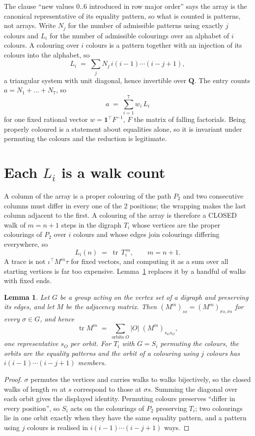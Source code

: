 \documentclass[11pt,a4paper]{article}
\theoremstyle{plain}
\newtheorem{lemma}[theorem]{Lemma}
\theoremstyle{definition}
\begin{document}
The clause ``new values $0..6$ introduced in row major order'' says the array is the
canonical representative of its equality pattern, so what is counted is patterns, not arrays.
Write $N_j$ for the number of admissible patterns using exactly $j$ colours and $L_i$ for the
number of admissible colourings over an alphabet of $i$ colours. A colouring over $i$ colours
is a pattern together with an injection of its colours into the alphabet, so
\[
L_i\;=\;\sum_j N_j\,i(i-1)\cdots(i-j+1),
\]
a triangular system with unit diagonal, hence invertible over $\mathbf{Q}$. The entry counts
$a=N_1+\dots+N_{7}$, so
\[
a\;=\;\sum_{i=1}^{7}w_i\,L_i
\]
for one fixed rational vector $w=\mathbf{1}^{\!\top}F^{-1}$, $F$ the matrix of falling
factorials. Being properly coloured is a statement about equalities alone, so it is invariant
under permuting the colours and the reduction is legitimate.

\section{Each $L_i$ is a walk count}

A column of the array is a proper colouring of the path $P_{2}$ and two consecutive
columns must differ in every one of the $2$ positions; the wrapping makes the last column
adjacent to the first. A colouring of the array is therefore a CLOSED walk of $m=n+1$ steps
in the digraph $T_i$ whose vertices are the proper colourings of $P_{2}$ over $i$ colours
and whose edges join colourings differing everywhere, so
\[
L_i(n)\;=\;\operatorname{tr}\,T_i^{\,m},\qquad m=n+1.
\]
A trace is not $\iota^{\!\top}M^m\tau$ for fixed vectors, and computing it as a sum over all
starting vertices is far too expensive. Lemma~\ref{lem:trace} replaces it by a handful of
walks with fixed ends.

\begin{lemma}\label{lem:trace}
Let $G$ be a group acting on the vertex set of a digraph and preserving its edges, and let $M$
be the adjacency matrix. Then $(M^m)_{ss}=(M^m)_{\sigma s,\sigma s}$ for every
$\sigma\in G$, and hence
\[
\operatorname{tr} M^m\;=\;\sum_{\text{orbits }O}|O|\;(M^m)_{s_O s_O} ,
\]
one representative $s_O$ per orbit. For $T_i$ with $G=S_i$ permuting the colours, the orbits
are the equality patterns and the orbit of a colouring using $j$ colours has
$i(i-1)\cdots(i-j+1)$ members.
\end{lemma}

\begin{proof}
$\sigma$ permutes the vertices and carries walks to walks bijectively, so the closed walks of
length $m$ at $s$ correspond to those at $\sigma s$. Summing the diagonal over each orbit
gives the displayed identity. Permuting colours preserves ``differ in every position'', so
$S_i$ acts on the colourings of $P_{2}$ preserving $T_i$; two colourings lie in one orbit
exactly when they have the same equality pattern, and a pattern using $j$ colours is realised
in $i(i-1)\cdots(i-j+1)$ ways.
\end{proof}
\end{document}
